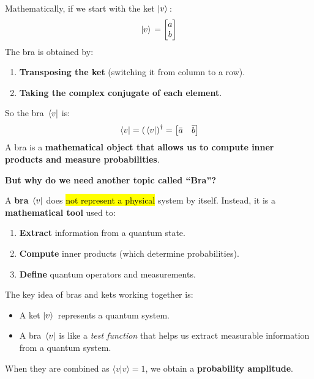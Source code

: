 \highspace
Mathematically, if we start with the ket $\left| v \rangle\right.$:
\begin{equation*}
    \left| v \rangle\right. = \begin{bmatrix}
        a \\ b
    \end{bmatrix}
\end{equation*}
The bra is obtained by:
\begin{enumerate}
    \item \textbf{Transposing the ket} (switching it from column to a row).
    \item \textbf{Taking the complex conjugate of each element}.
\end{enumerate}
So the bra $\left.\langle v \right|$ is:
\begin{equation*}
    \left.\langle v \right| = \left(\left.\langle v \right|\right)^{\dagger} = \begin{bmatrix}
        \bar{a} & \bar{b}
    \end{bmatrix}
\end{equation*}
A bra is a \textbf{mathematical object that allows us to compute inner products and measure probabilities}.

\highspace
\begin{flushleft}
    \textcolor{Green3}{ \textbf{But why do we need another topic called ``Bra''?}}
\end{flushleft}
A \textbf{bra} $\left.\langle v \right|$ does \hl{not represent a physical} system by itself. Instead, it is a \textbf{mathematical tool} used to:
\begin{enumerate}
    \item \textbf{Extract} information from a quantum state.
    \item \textbf{Compute} inner products (which determine probabilities).
    \item \textbf{Define} quantum operators and measurements.
\end{enumerate}
The key idea of bras and kets working together is:
\begin{itemize}
    \item A ket $\left| v \rangle\right.$ represents a quantum system.
    \item A bra $\left.\langle v \right|$ is like a \emph{test function} that helps us extract measurable information from a quantum system.
\end{itemize}
When they are combined as $\langle v | v \rangle = 1$, we obtain a \textbf{probability amplitude}.

\newpage

